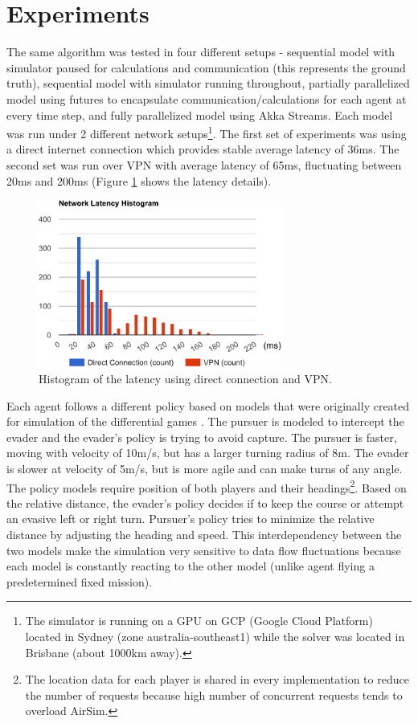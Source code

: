 \documentclass{article}
\let\cite\citep
\begin{document}
\section{Experiments} \label{sec:exp}
The same algorithm was tested in four different setups - sequential model with simulator paused for calculations and communication (this represents the ground truth), sequential model with simulator running throughout, partially parallelized model using futures to encapsulate communication/calculations for each agent at every time step, and fully parallelized model using Akka Streams. Each model was run under 2 different network setups\footnote{The simulator is running on a GPU on GCP (Google Cloud Platform) located in Sydney (zone australia-southeast1) while the solver was located in Brisbane (about 1000km away).}. The first set of experiments was using a direct internet connection which provides stable average latency of 36ms. The second set was run over VPN with average latency of 65ms, fluctuating between 20ms and 200ms (Figure \ref{fig:network-latency} shows the latency details). 

\begin{figure}
	\centering
	\includegraphics[width=8.0cm]{network-latency}
	\caption{Histogram of the latency using direct connection and VPN.}\label{fig:network-latency}
\end{figure}

Each agent follows a different policy based on models that were originally created for simulation of the differential games \cite{redulla2018simulating}. The pursuer is modeled to intercept the evader and the evader's policy is trying to avoid capture. The pursuer is faster, moving with velocity of 10m/s, but has a larger turning radius of 8m. The evader is slower at velocity of 5m/s, but is more agile and can make turns of any angle. The policy models require position of both players and their headings\footnote{The location data for each player is shared in every implementation to reduce the number of requests because high number of concurrent requests tends to overload AirSim.}. Based on the relative distance, the evader's policy decides if to keep the course or attempt an evasive left or right turn. Pursuer's policy tries to minimize the relative distance by adjusting the heading and speed. This interdependency between the two models make the simulation very sensitive to data flow fluctuations because each model is constantly reacting to the other model (unlike agent flying a predetermined fixed mission).   
\end{document}
